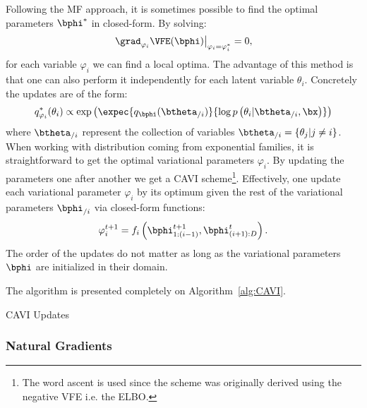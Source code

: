 Following the \ac{MF} approach, it is sometimes possible to find the optimal parameters $\bphi^*$ in closed-form.
By solving:
\begin{align}
\left.\grad_{\varphi_i}\VFE(\bphi)\right\vert_{\varphi_i=\varphi_i^*} = 0,
\end{align}
for each variable $\varphi_i$ we can find a local optima.
The advantage of this method is that one can also perform it independently for each latent variable $\theta_i$.
Concretely the updates are of the form:
\begin{align}
q_{\varphi_i}^*(\theta_i) \propto \exp\left(\expec{q_{\bphi}(\btheta_{/i})}{\log p\left(\theta_i|\btheta_{/i},\bx\right)}\right)
\end{align}
where $\btheta_{/i}$ represent the collection of variables $\btheta_{/i} = \{\theta_j | j \neq i\}$.
When working with distribution coming from exponential families, it is straightforward to get the optimal variational parameters $\varphi_i$.
By updating the parameters one after another we get a \ac{CAVI} scheme\footnote{The word ascent is used since the scheme was originally derived using the negative \ac{VFE} i.e. the \ac{ELBO}.}.
Effectively, one update each variational parameter $\varphi_i$ by its optimum given the rest of the variational parameters $\bphi_{/i}$ via closed-form functions:
\begin{align}
\varphi_i^{t+1} = f_i\left(\bphi_{1:(i-1)}^{t+1}, \bphi_{(i+1):D}^t\right).
\end{align}
The order of the updates do not matter as long as the variational parameters $\bphi$ are initialized in their domain.

The algorithm is presented completely on Algorithm~\ref{alg:CAVI}.

\begin{algorithm}
    \caption{\ac{CAVI} Updates}
    \label{alg:CAVI}
\end{algorithm}


\subsubsection{Natural Gradients}

